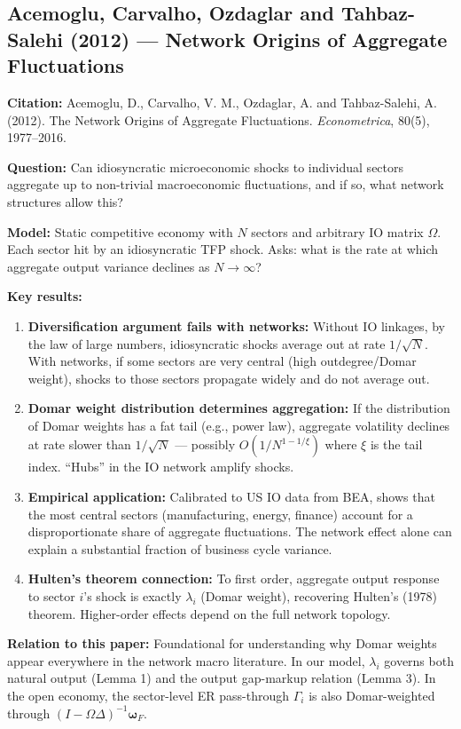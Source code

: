 \documentclass[12pt]{article}
\begin{document}
\subsection{Acemoglu, Carvalho, Ozdaglar and Tahbaz-Salehi (2012) --- Network Origins of Aggregate Fluctuations}

\textbf{Citation:} Acemoglu, D., Carvalho, V. M., Ozdaglar, A. and Tahbaz-Salehi, A. (2012). The Network Origins of Aggregate Fluctuations. \textit{Econometrica}, 80(5), 1977--2016.

\textbf{Question:} Can idiosyncratic microeconomic shocks to individual sectors aggregate up to non-trivial macroeconomic fluctuations, and if so, what network structures allow this?

\textbf{Model:} Static competitive economy with $N$ sectors and arbitrary IO matrix $\Omega$. Each sector hit by an idiosyncratic TFP shock. Asks: what is the rate at which aggregate output variance declines as $N \to \infty$?

\textbf{Key results:}
\begin{enumerate}
    \item \textbf{Diversification argument fails with networks:} Without IO linkages, by the law of large numbers, idiosyncratic shocks average out at rate $1/\sqrt{N}$. With networks, if some sectors are very central (high outdegree/Domar weight), shocks to those sectors propagate widely and do not average out.
    \item \textbf{Domar weight distribution determines aggregation:} If the distribution of Domar weights has a fat tail (e.g., power law), aggregate volatility declines at rate slower than $1/\sqrt{N}$ --- possibly $O(1/N^{1-1/\xi})$ where $\xi$ is the tail index. ``Hubs'' in the IO network amplify shocks.
    \item \textbf{Empirical application:} Calibrated to US IO data from BEA, shows that the most central sectors (manufacturing, energy, finance) account for a disproportionate share of aggregate fluctuations. The network effect alone can explain a substantial fraction of business cycle variance.
    \item \textbf{Hulten's theorem connection:} To first order, aggregate output response to sector $i$'s shock is exactly $\lambda_i$ (Domar weight), recovering Hulten's (1978) theorem. Higher-order effects depend on the full network topology.
\end{enumerate}

\textbf{Relation to this paper:} Foundational for understanding why Domar weights appear everywhere in the network macro literature. In our model, $\lambda_i$ governs both natural output (Lemma 1) and the output gap-markup relation (Lemma 3). In the open economy, the sector-level ER pass-through $\Gamma_i$ is also Domar-weighted through $(I-\Omega\Delta)^{-1}\bm{\omega}_F$.
\end{document}
